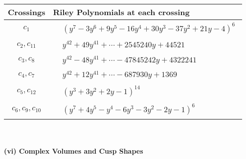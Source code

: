 \documentclass[1p]{elsarticle_modified}
\theoremstyle{definition}
\begin{document}
\begin{tabular}{m{50pt}|m{274pt}}
Crossings & \hspace{64pt}Riley Polynomials at each crossing \\
\hline $$\begin{aligned}c_{1}\end{aligned}$$&$\begin{aligned}
&(y^7-3 y^6+9 y^5-16 y^4+30 y^3-37 y^2+21 y-4)^6
\end{aligned}$\\
\hline $$\begin{aligned}c_{2},c_{11}\end{aligned}$$&$\begin{aligned}
&y^{42}+49 y^{41}+\cdots+2545240 y+44521
\end{aligned}$\\
\hline $$\begin{aligned}c_{3},c_{8}\end{aligned}$$&$\begin{aligned}
&y^{42}-48 y^{41}+\cdots-47845242 y+4322241
\end{aligned}$\\
\hline $$\begin{aligned}c_{4},c_{7}\end{aligned}$$&$\begin{aligned}
&y^{42}+12 y^{41}+\cdots-687930 y+1369
\end{aligned}$\\
\hline $$\begin{aligned}c_{5},c_{12}\end{aligned}$$&$\begin{aligned}
&(y^3+3 y^2+2 y-1)^{14}
\end{aligned}$\\
\hline $$\begin{aligned}c_{6},c_{9},c_{10}\end{aligned}$$&$\begin{aligned}
&(y^7+4 y^5- y^4-6 y^3-3 y^2-2 y-1)^6
\end{aligned}$\\
\hline
\end{tabular}\\~\\
\newpage\flushleft \textbf{(vi) Complex Volumes and Cusp Shapes}
\end{document}
